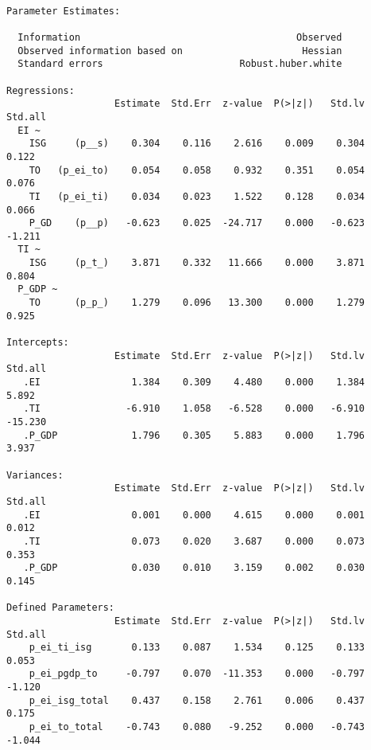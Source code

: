 \begin{verbatim}

Parameter Estimates:

  Information                                      Observed
  Observed information based on                     Hessian
  Standard errors                        Robust.huber.white

Regressions:
                   Estimate  Std.Err  z-value  P(>|z|)   Std.lv  Std.all
  EI ~                                                                  
    ISG     (p__s)    0.304    0.116    2.616    0.009    0.304    0.122
    TO   (p_ei_to)    0.054    0.058    0.932    0.351    0.054    0.076
    TI   (p_ei_ti)    0.034    0.023    1.522    0.128    0.034    0.066
    P_GD    (p__p)   -0.623    0.025  -24.717    0.000   -0.623   -1.211
  TI ~                                                                  
    ISG     (p_t_)    3.871    0.332   11.666    0.000    3.871    0.804
  P_GDP ~                                                               
    TO      (p_p_)    1.279    0.096   13.300    0.000    1.279    0.925

Intercepts:
                   Estimate  Std.Err  z-value  P(>|z|)   Std.lv  Std.all
   .EI                1.384    0.309    4.480    0.000    1.384    5.892
   .TI               -6.910    1.058   -6.528    0.000   -6.910  -15.230
   .P_GDP             1.796    0.305    5.883    0.000    1.796    3.937

Variances:
                   Estimate  Std.Err  z-value  P(>|z|)   Std.lv  Std.all
   .EI                0.001    0.000    4.615    0.000    0.001    0.012
   .TI                0.073    0.020    3.687    0.000    0.073    0.353
   .P_GDP             0.030    0.010    3.159    0.002    0.030    0.145

Defined Parameters:
                   Estimate  Std.Err  z-value  P(>|z|)   Std.lv  Std.all
    p_ei_ti_isg       0.133    0.087    1.534    0.125    0.133    0.053
    p_ei_pgdp_to     -0.797    0.070  -11.353    0.000   -0.797   -1.120
    p_ei_isg_total    0.437    0.158    2.761    0.006    0.437    0.175
    p_ei_to_total    -0.743    0.080   -9.252    0.000   -0.743   -1.044

\end{verbatim}

